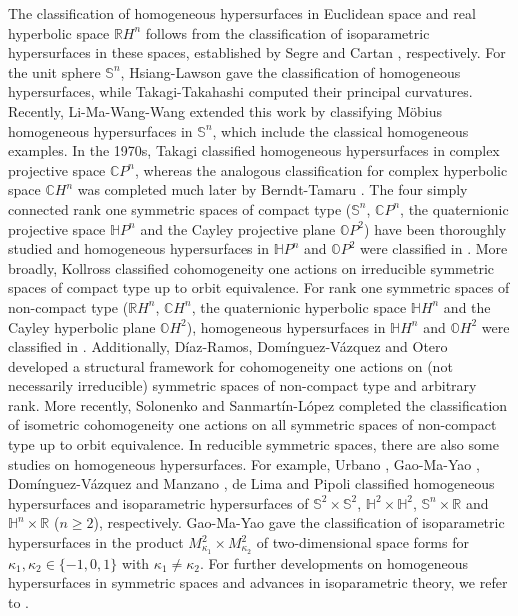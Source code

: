 \documentclass[reqno]{amsart}%
\theoremstyle{definition}
\numberwithin{equation}{section}
\begin{document}
	The classification of homogeneous hypersurfaces in Euclidean space and real hyperbolic space
	$\mathbb{R}H^n$ follows from the classification of isoparametric hypersurfaces in these spaces, established by Segre \cite{S} and Cartan \cite{C}, respectively. For the unit sphere
	$\mathbb{S}^n$, Hsiang-Lawson \cite{HL} gave the classification of homogeneous hypersurfaces, while Takagi-Takahashi \cite{TT} computed their principal curvatures. Recently, Li-Ma-Wang-Wang \cite{LMWW} extended this work by classifying M\"{o}bius homogeneous hypersurfaces in $\mathbb{S}^n$, which include the classical homogeneous examples.
	In the 1970s, Takagi \cite{T1} classified homogeneous hypersurfaces in complex projective space
	$\mathbb{C}P^n$, whereas the analogous classification for complex hyperbolic space
	$\mathbb{C}H^n$ was completed much later by Berndt-Tamaru \cite{BT}. The four simply connected rank one symmetric spaces of compact type ($\mathbb{S}^n$, $\mathbb{C}P^n$, the quaternionic projective space $\mathbb{H}P^n$ and the Cayley projective plane $\mathbb{O}P^2$) have been thoroughly studied and homogeneous hypersurfaces in
	$\mathbb{H}P^n$ and $\mathbb{O}P^2$ were classified in \cite{D1,I1,I2}. More broadly, Kollross \cite{K1} classified cohomogeneity one actions on irreducible symmetric spaces of compact type up to orbit equivalence.
	For rank one symmetric spaces of non-compact type ($\mathbb{R}H^n$,
	$\mathbb{C}H^n$, the quaternionic hyperbolic space $\mathbb{H}H^n$
	and the Cayley hyperbolic plane $\mathbb{O}H^2$), homogeneous hypersurfaces in
	$\mathbb{H}H^n$ and $\mathbb{O}H^2$ were classified in \cite{BT,DDO2,DDR}. Additionally, D\'{i}az-Ramos, Dom\'{i}nguez-V\'{a}zquez and Otero \cite{DDO} developed a structural framework for cohomogeneity one actions on (not necessarily irreducible) symmetric spaces of non-compact type and arbitrary rank.
	More recently, Solonenko and Sanmart\'{i}n-L\'{o}pez \cite{SS} completed the classification of isometric cohomogeneity one actions on all symmetric spaces of non-compact type
	up to orbit equivalence.
	In reducible symmetric spaces, there are also some studies on homogeneous hypersurfaces.
	For example, Urbano \cite{U}, Gao-Ma-Yao \cite{GMY}, Dom\'{i}nguez-V\'{a}zquez and Manzano \cite{DM},
	de Lima and Pipoli \cite{LP}
	classified homogeneous hypersurfaces and isoparametric hypersurfaces of $\mathbb{S}^2\times\mathbb{S}^2$, $\mathbb{H}^2\times\mathbb{H}^2$,
	$\mathbb{S}^n\times\mathbb{R}$ and $\mathbb{H}^n\times\mathbb{R}$ ($n\geq 2$), respectively.
	Gao-Ma-Yao \cite{GMY2} gave the classification of isoparametric hypersurfaces
	in the product $M_{\kappa_1}^2\times M_{\kappa_2}^2$ of two-dimensional space forms for
	$\kappa_1, \kappa_2\in \{-1,0,1\}$ with $\kappa_1\neq\kappa_2$.
	For further developments on homogeneous hypersurfaces in symmetric spaces and advances in isoparametric theory, we refer to \cite{C1,DDO2,GQTY}.
	
\end{document}
